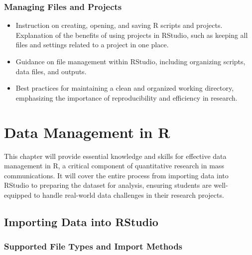 \documentclass[
]{book}
\begin{document}
\hypertarget{managing-files-and-projects}{%
\subsection*{Managing Files and Projects}\label{managing-files-and-projects}}

\begin{itemize}
\item
  Instruction on creating, opening, and saving R scripts and projects. Explanation of the benefits of using projects in RStudio, such as keeping all files and settings related to a project in one place.
\item
  Guidance on file management within RStudio, including organizing scripts, data files, and outputs.
\item
  Best practices for maintaining a clean and organized working directory, emphasizing the importance of reproducibility and efficiency in research.
\end{itemize}

\hypertarget{data-management-in-r}{%
\chapter*{Data Management in R}\label{data-management-in-r}}

This chapter will provide essential knowledge and skills for effective data management in R, a critical component of quantitative research in mass communications. It will cover the entire process from importing data into RStudio to preparing the dataset for analysis, ensuring students are well-equipped to handle real-world data challenges in their research projects.

\hypertarget{importing-data-into-rstudio}{%
\section*{Importing Data into RStudio}\label{importing-data-into-rstudio}}

\hypertarget{supported-file-types-and-import-methods}{%
\subsection*{Supported File Types and Import Methods}\label{supported-file-types-and-import-methods}}
\end{document}
